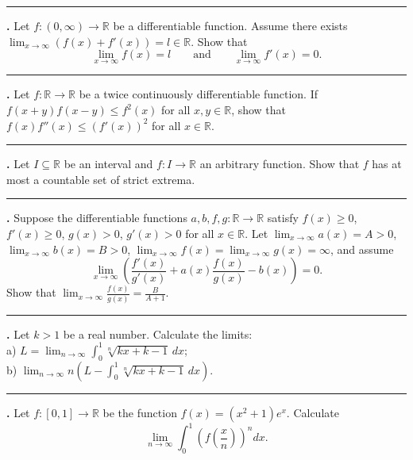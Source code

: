 \documentclass[11pt]{article}
\newcounter{probnum}
\newenvironment{problembox}{\par\noindent\rule{\linewidth}{0.5pt}\vspace{5pt}\par}{\vspace{2pt}}
\begin{document}
\begin{problembox}
\textbf{\theprobnum.} Let $f : (0,\infty) \to \mathbb{R}$ be a differentiable function. Assume there exists $\displaystyle\lim_{x \to \infty} (f(x)+f'(x)) = l \in \mathbb{R}$. Show that
\[
\lim_{x \to \infty} f(x) = l \qquad \text{and} \qquad \lim_{x \to \infty} f'(x) = 0.
\]
\end{problembox}

\begin{problembox}
\textbf{\theprobnum.} Let $f : \mathbb{R} \to \mathbb{R}$ be a twice continuously differentiable function. If $f(x+y)f(x-y) \le f^2(x)$ for all $x,y \in \mathbb{R}$, show that $f(x)f''(x) \le (f'(x))^2$ for all $x \in \mathbb{R}$.
\end{problembox}

\begin{problembox}
\textbf{\theprobnum.} Let $I \subseteq \mathbb{R}$ be an interval and $f : I \to \mathbb{R}$ an arbitrary function. Show that $f$ has at most a countable set of strict extrema.
\end{problembox}

\begin{problembox}
\textbf{\theprobnum.} Suppose the differentiable functions $a,b,f,g : \mathbb{R} \to \mathbb{R}$ satisfy $f(x) \ge 0$, $f'(x) \ge 0$, $g(x) > 0$, $g'(x) > 0$ for all $x \in \mathbb{R}$. Let $\displaystyle\lim_{x \to \infty} a(x) = A > 0$, $\displaystyle\lim_{x \to \infty} b(x) = B > 0$, $\displaystyle\lim_{x \to \infty} f(x) = \lim_{x \to \infty} g(x) = \infty$, and assume
\[
\lim_{x \to \infty} \left( \frac{f'(x)}{g'(x)} + a(x) \frac{f(x)}{g(x)} - b(x) \right) = 0.
\]
Show that $\displaystyle\lim_{x \to \infty} \frac{f(x)}{g(x)} = \frac{B}{A+1}$.
\end{problembox}

\begin{problembox}
\textbf{\theprobnum.} Let $k > 1$ be a real number. Calculate the limits:\\
a) $L = \displaystyle\lim_{n \to \infty} \int_0^1 \sqrt[n]{kx+k-1}\,dx$;\\
b) $\displaystyle\lim_{n \to \infty} n \left(L - \int_0^1 \sqrt[n]{kx+k-1}\,dx\right)$.
\end{problembox}

\begin{problembox}
\textbf{\theprobnum.} Let $f : [0,1] \to \mathbb{R}$ be the function $f(x) = (x^2+1)e^x$. Calculate
\[
\lim_{n \to \infty} \int_0^1 \left(f\left(\frac{x}{n}\right)\right)^n dx.
\]
\end{problembox}
\end{document}
